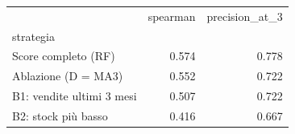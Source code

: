 \begin{tabular}{lrr}
\toprule
 & spearman & precision_at_3 \\
strategia &  &  \\
\midrule
Score completo (RF) & 0.574 & 0.778 \\
Ablazione (D = MA3) & 0.552 & 0.722 \\
B1: vendite ultimi 3 mesi & 0.507 & 0.722 \\
B2: stock più basso & 0.416 & 0.667 \\
\bottomrule
\end{tabular}

